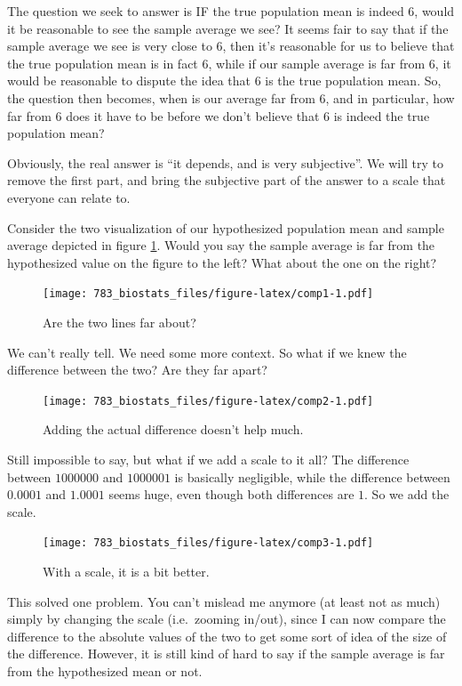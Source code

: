 \documentclass[]{book}
\theoremstyle{definition}
\theoremstyle{definition}
\theoremstyle{definition}
\theoremstyle{remark}
\begin{document}
The question we seek to answer is IF the true population mean is indeed 6, would it be reasonable to see the sample average we see? It seems fair to say that if the sample average we see is very close to 6, then it's reasonable for us to believe that the true population mean is in fact 6, while if our sample average is far from 6, it would be reasonable to dispute the idea that 6 is the true population mean. So, the question then becomes, when is our average far from 6, and in particular, how far from 6 does it have to be before we don't believe that 6 is indeed the true population mean?

Obviously, the real answer is ``it depends, and is very subjective''. We will try to remove the first part, and bring the subjective part of the answer to a scale that everyone can relate to.

Consider the two visualization of our hypothesized population mean and sample average depicted in figure \ref{fig:comp1}. Would you say the sample average is far from the hypothesized value on the figure to the left? What about the one on the right?

\begin{figure}
\centering
\texttt{[image: 783\_biostats\_files/figure-latex/comp1-1.pdf]}
\caption{\label{fig:comp1}Are the two lines far about?}
\end{figure}

We can't really tell. We need some more context. So what if we knew the difference between the two? Are they far apart?

\begin{figure}
\centering
\texttt{[image: 783\_biostats\_files/figure-latex/comp2-1.pdf]}
\caption{\label{fig:comp2}Adding the actual difference doesn't help much.}
\end{figure}

Still impossible to say, but what if we add a scale to it all? The difference between \(1000000\) and \(1000001\) is basically negligible, while the difference between \(0.0001\) and \(1.0001\) seems huge, even though both differences are \(1\). So we add the scale.

\begin{figure}
\centering
\texttt{[image: 783\_biostats\_files/figure-latex/comp3-1.pdf]}
\caption{\label{fig:comp3}With a scale, it is a bit better.}
\end{figure}

This solved one problem. You can't mislead me anymore (at least not as much) simply by changing the scale (i.e.~zooming in/out), since I can now compare the difference to the absolute values of the two to get some sort of idea of the size of the difference. However, it is still kind of hard to say if the sample average is far from the hypothesized mean or not.
\end{document}
